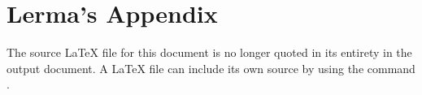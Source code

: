 \chapter{Lerma's Appendix}
%
The source \LaTeX{} file for this document is no longer quoted in
its entirety in the output document. A \LaTeX{} file can 
include its own source by using the command
.

